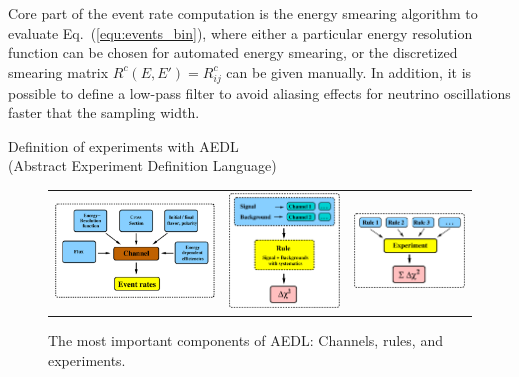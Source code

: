 \documentclass[12pt,a4paper]{article}
\makeatletter
\renewcommand{\section}{\@startsection{section}{1}{0em}{-\baselineskip}%
{\baselineskip}{\normalfont\large\bfseries}}
\newcommand{\eq}{Eq.}
\newcommand{\AEDL}{{\sf AEDL}}
\newcommand{\equ}[1]{\eq~(\ref{equ:#1})}
\makeatother
\begin{document}
Core part of the event rate computation is the energy smearing algorithm
to evaluate \equ{events_bin}, where either a particular energy resolution
 function can be chosen for automated energy smearing, or the discretized
smearing matrix $R^c(E,E') = R^c_{ij} $ can be given manually. In addition, it is possible
to define a low-pass filter to avoid aliasing effects for neutrino
oscillations faster that the sampling width.

\section{Definition of experiments with \AEDL\\ (Abstract Experiment 
Definition Language)}

\begin{figure}[t]
\begin{center}
\begin{tabular}{p{6.3cm}p{4.3cm}p{4.3cm}}
\includegraphics[width=6.5cm]{AEDL1} &
\includegraphics[width=4.5cm]{SignalBackground} &
\includegraphics[width=4.5cm]{Rules} \\
\end{tabular}
\end{center}
\caption{\label{fig:aedl} The most important components of \AEDL :
Channels, rules, and experiments.}
\end{figure}
\end{document}
